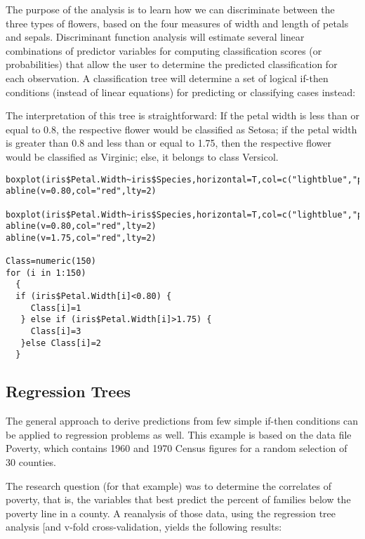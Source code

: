 \documentclass[caret-main.tex]{subfiles}
\begin{document}
The purpose of the analysis is to learn how we can discriminate between the three types of flowers, based on the four measures of width and length of petals and sepals. Discriminant function analysis will estimate several linear combinations of predictor variables for computing classification scores (or probabilities) that allow the user to determine the predicted classification for each observation. A classification tree will determine a set of logical if-then conditions (instead of linear equations) for predicting or classifying cases instead:



The interpretation of this tree is straightforward: If the petal width is less than or equal to 0.8, the respective flower would be classified as Setosa; if the petal width is greater than 0.8 and less than or equal to 1.75, then the respective flower would be classified as Virginic; else, it belongs to class Versicol.


\begin{verbatim}
boxplot(iris$Petal.Width~iris$Species,horizontal=T,col=c("lightblue","pink","yellow"),font.lab=2,pch=16)
abline(v=0.80,col="red",lty=2)

boxplot(iris$Petal.Width~iris$Species,horizontal=T,col=c("lightblue","pink","yellow"),font.lab=2,pch=16)
abline(v=0.80,col="red",lty=2)
abline(v=1.75,col="red",lty=2)

Class=numeric(150)
for (i in 1:150)
  { 
  if (iris$Petal.Width[i]<0.80) { 
     Class[i]=1
   } else if (iris$Petal.Width[i]>1.75) { 
     Class[i]=3
   }else Class[i]=2
  }
\end{verbatim}


\subsection{Regression Trees}
The general approach to derive predictions from few simple if-then conditions can be applied to regression problems as well. This example is based on the data file Poverty, which contains 1960 and 1970 Census figures for a random selection of 30 counties. 

The research question (for that example) was to determine the correlates of poverty, that is, the variables that best predict the percent of families below the poverty line in a county. A reanalysis of those data, using the regression tree analysis [and v-fold cross-validation, yields the following results:
\end{document}
